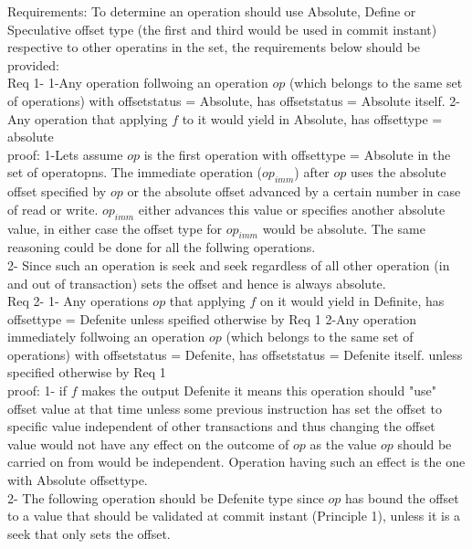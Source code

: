 \documentclass[a4paper, 11pt]{article}
\begin{document}
Requirements: To determine an operation should use Absolute, Define or Speculative offset type (the first and third would be used in commit instant) respective to other operatins in the set, the requirements below should be provided:\\

Req 1- 1-Any operation follwoing an operation $op$ (which belongs to the same set of operations) with offsetstatus = Absolute, has offsetstatus = Absolute itself. 2-Any operation that applying $f$ to it would yield in Absolute, has offsettype = absolute \\

proof: 1-Lets assume $op$ is the first operation with offsettype = Absolute in the set of operatopns. The immediate operation ($op_{imm}$) after $op$ uses the absolute offset specified by $op$ or the absolute offset advanced by a certain number in case of read or write. $op_{imm}$ either advances this value or specifies another absolute value, in either case the offset type for $op_{imm}$ would be absolute. The same reasoning could be done for all the follwing operations.\\

2- Since such an operation is seek and seek regardless of all other operation (in and out of transaction) sets the offset and hence is always absolute.\\

Req 2- 1- Any operations $op$ that applying $f$ on it would yield in Definite, has offsettype = Defenite unless speified otherwise by Req 1  2-Any operation immediately follwoing an operation $op$ (which belongs to the same set of operations) with offsetstatus = Defenite, has offsetstatus = Defenite itself. unless specified otherwise by Req 1\\

proof: 1- if $f$ makes the output Defenite it means this operation should "use" offset value at that time unless some previous instruction has set the offset to specific value independent of other transactions and thus changing the offset value would not have any effect on the outcome of $op$ as the value $op$ should be carried on from would be independent. Operation having such an effect is the one with Absolute offsettype.\\

2- The following operation should be Defenite type since $op$ has bound the offset to a value that should be validated at commit instant (Principle 1), unless it is a seek that only sets the offset.\\ 
\end{document}
